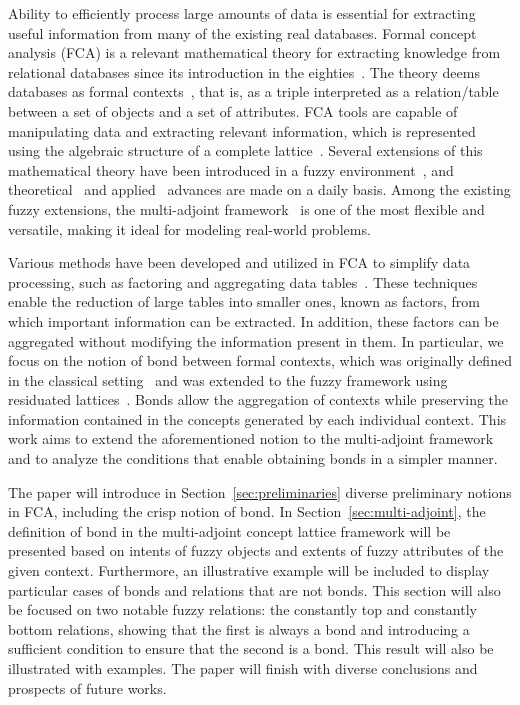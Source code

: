 \documentclass[runningheads,a4paper]{llncs}
\begin{document}
Ability to efficiently process large amounts of data  is essential for extracting useful information from many of the existing real databases. Formal concept analysis (FCA) is a relevant mathematical theory for extracting knowledge from relational databases since its introduction in the eighties~\cite{Wille:1982}. The theory deems databases as formal contexts~\cite{GanterW}, that is, as a triple interpreted as a relation/table between   a set of objects and a set of attributes. FCA tools are capable of manipulating data and extracting relevant information, which is represented using the algebraic structure of a complete lattice~\cite{GanterW}.  Several extensions of this mathematical theory have been introduced in a fuzzy environment~\cite{belohlavek:2001,burusco:1998,Stano:GCL}, and theoretical~\cite{aragonMath21,aragonJCAM21,OJEDAHERNANDEZ23,PEREZGAMEZ2023505} and applied~\cite{Alcalde2020Red,alilipedrycz2023,SOKOL2023108940} {advances} are made on a daily basis. Among the existing fuzzy extensions,  the multi-adjoint framework~\cite{TFS:2020-acmr,ar:ins:2015,ins2018:cmr,mor-fss-cmpi} is one of the most flexible and versatile, making it ideal for modeling real-world problems.

Various methods have been developed and utilized in FCA to simplify data processing, %
such as factoring and aggregating data tables~\cite{COAMfac2024,BELOHLAVEK20103,dubois:2012,KRIDLO22IS,valverdeipmu18art}. These techniques enable the reduction of large tables into smaller ones, known as factors, from which important information can be extracted. In addition, these factors can be aggregated without modifying the information present in them. In particular, we focus on the notion of bond between formal contexts, which was originally defined in the classical setting~\cite{GanterW} and was extended to the fuzzy framework using residuated lattices~\cite{konecnyijgs16,KridloKO12,KRIDLO2023119498}. Bonds allow the aggregation of contexts while preserving the information contained in the concepts generated by each individual context. This work aims to extend the aforementioned notion to the multi-adjoint framework and to analyze the conditions that enable obtaining bonds in a simpler manner.

The paper will introduce in Section~\ref{sec:preliminaries} diverse preliminary notions in FCA, including the crisp notion of bond. In Section~\ref{sec:multi-adjoint}, the definition of bond in the multi-adjoint concept lattice framework will be presented based on  intents of fuzzy objects and extents of fuzzy attributes of the given context. Furthermore, an illustrative example  will be included to display particular cases of bonds and    relations that are not  bonds.  This section will also  be focused on two  notable fuzzy  relations: the constantly top and constantly bottom relations, showing that the first is always a bond and  introducing a sufficient condition  to ensure that the second is a bond. This result will also be illustrated with examples. The paper will finish with diverse conclusions and  prospects of future works.
\end{document}
